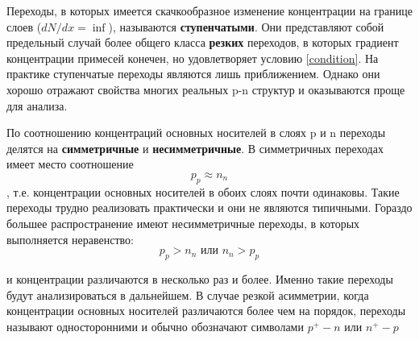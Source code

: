 Переходы, в которых имеется скачкообразное изменение концентрации на границе слоев ($dN/dx = \inf$), называются \textbf{ступенчатыми}. Они представляют собой предельный случай более общего класса \textbf{резких} переходов, в которых градиент концентрации примесей конечен, но удовлетворяет условию \ref{condition}. На практике ступенчатые переходы являются лишь приближением. Однако они хорошо отражают свойства многих реальных p-n структур и оказываются проще для анализа.

По соотношению концентраций основных носителей в слоях p и n переходы делятся на \textbf{симметричные} и \textbf{несимметричные}. В симметричных переходах имеет место соотношение 
$$
p_p \approx n_n
$$,
т.е. концентрации основных носителей в обоих слоях почти одинаковы. Такие переходы трудно реализовать практически и они не являются типичными. Гораздо большее распространение имеют несимметричные переходы, в которых выполняется неравенство:
$$
p_p > n_n \textit{ или } n_n > p_p
$$

и концентрации различаются в несколько раз и более. Именно такие переходы будут анализироваться в дальнейшем. В случае резкой асимметрии, когда концентрации основных носителей различаются более чем на порядок, переходы называют односторонними и обычно обозначают символами $p^+-n$ или $n^+-p$





